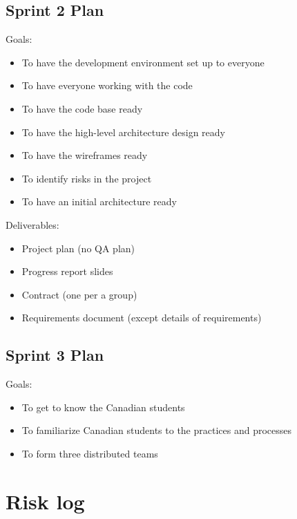 \subsection{Sprint 2 Plan}

Goals:
\begin{itemize}
  \item To have the development environment set up to everyone \checked
  \item To have everyone working with the code \checked
  \item To have the code base ready
  \item To have the high-level architecture design ready
  \item To have the wireframes ready \checked
  \item To identify risks in the project \checked
  \item To have an initial architecture ready \checked
\end{itemize}

\noindent Deliverables:
\begin{itemize}
  \item Project plan (no QA plan)
  \item Progress report slides 
  \item Contract (one per a group) \checked
  \item Requirements document (except details of requirements)
\end{itemize}

\subsection{Sprint 3 Plan}

Goals:
\begin{itemize}
  \item To get to know the Canadian students
  \item To familiarize Canadian students to the practices and processes
  \item To form three distributed teams
\end{itemize}

\section{Risk log}

